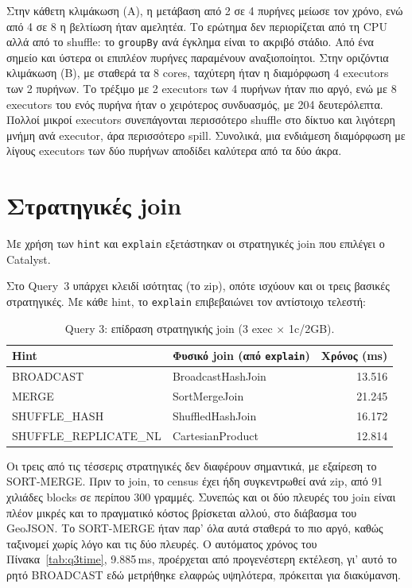 \documentclass[11pt]{article}
\newcommand{\code}[1]{\texttt{\small #1}}
\newcommand{\en}[1]{\textenglish{#1}}
\begin{document}
Στην κάθετη κλιμάκωση (Α), η μετάβαση από 2 σε 4 πυρήνες μείωσε τον χρόνο, ενώ από
4 σε 8 η βελτίωση ήταν αμελητέα. Το ερώτημα δεν περιορίζεται από τη \en{CPU} αλλά
από το \en{shuffle}: το \code{groupBy} ανά έγκλημα είναι το ακριβό στάδιο. Από ένα σημείο και ύστερα οι επιπλέον πυρήνες παραμένουν αναξιοποίητοι. 
Στην οριζόντια κλιμάκωση (Β), με σταθερά τα 8 \en{cores}, ταχύτερη ήταν η διαμόρφωση 4
\en{executors} των 2 πυρήνων. Το τρέξιμο με 2 \en{executors} των 4 πυρήνων ήταν πιο
αργό, ενώ με 8 \en{executors} του ενός πυρήνα ήταν ο χειρότερος συνδυασμός, με 204 δευτερόλεπτα. 
Πολλοί μικροί \en{executors}
συνεπάγονται περισσότερο \en{shuffle} στο δίκτυο και λιγότερη μνήμη ανά
\en{executor}, άρα περισσότερο \en{spill}. Συνολικά, μια ενδιάμεση διαμόρφωση με
λίγους \en{executors} των δύο πυρήνων αποδίδει καλύτερα από τα δύο άκρα.

\section{Στρατηγικές join}

Με χρήση των \code{hint} και \code{explain} εξετάστηκαν οι στρατηγικές \en{join}
που επιλέγει ο \en{Catalyst}.

Στο \en{Query}~3 υπάρχει κλειδί ισότητας (το \en{zip}), οπότε ισχύουν και οι τρεις
βασικές στρατηγικές. Με κάθε \en{hint}, το \code{explain} επιβεβαιώνει τον
αντίστοιχο τελεστή:

\begin{table}[h]\centering
\begin{tabular}{llr}
\toprule
\en{Hint} & Φυσικό \en{join} (από \code{explain}) & Χρόνος (ms) \\
\midrule
\en{BROADCAST}              & \en{BroadcastHashJoin} & 13.516 \\
\en{MERGE}                  & \en{SortMergeJoin}     & 21.245 \\
\en{SHUFFLE\_HASH}          & \en{ShuffledHashJoin}  & 16.172 \\
\en{SHUFFLE\_REPLICATE\_NL} & \en{CartesianProduct}  & 12.814 \\
\bottomrule
\end{tabular}
\caption{Query 3: επίδραση στρατηγικής join (3 \en{exec} $\times$ 1\en{c}/2\en{GB}).}
\end{table}

Οι τρεις από τις τέσσερις στρατηγικές δεν διαφέρουν σημαντικά, με εξαίρεση το
\en{SORT-MERGE}. Πριν το \en{join}, το
\en{census} έχει ήδη συγκεντρωθεί ανά \en{zip}, από 91 χιλιάδες \en{blocks} σε
περίπου 300 γραμμές. Συνεπώς και οι δύο πλευρές του \en{join} είναι πλέον μικρές
και το πραγματικό κόστος βρίσκεται αλλού, στο διάβασμα του \en{GeoJSON}. Το
\en{SORT-MERGE} ήταν παρ' όλα αυτά σταθερά το πιο αργό, καθώς ταξινομεί χωρίς λόγο
και τις δύο πλευρές. Ο αυτόματος χρόνος του Πίνακα~\ref{tab:q3time}, 9.885\,ms,
προέρχεται από προγενέστερη εκτέλεση, γι' αυτό το ρητό \en{BROADCAST} εδώ μετρήθηκε 
ελαφρώς υψηλότερα, πρόκειται για διακύμανση.
\end{document}
